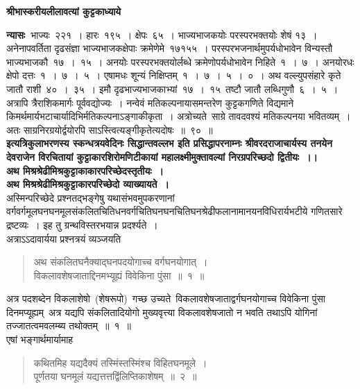 \documentclass[11pt, openany]{book}
\begin{document}
\textbf{श्रीभास्करीयलीलावत्यां कुट्टकाध्याये\textendash }


\newpage
\thispagestyle{fancy}
\fancyhf{}
\indent
\textbf{न्यासः\textendash\ }भाज्यः~२२१~। हारः~१९५~। क्षेपः~६५~। भाज्यभाजकयोः
परस्परभक्तयोः शेषं १३~। अनेनापवर्तिता दृढसंज्ञा भाज्यभाजकक्षेपाः क्रमेणेमे~१७\textendash१५\textendash५~। परस्परभजनार्थमुपर्यधोभावेन विन्यस्तौ भाज्यभाजकौ~१७~।~१५~। अनयोः परस्परभक्तयोर्लब्धे क्रमेणोपर्यधोभावेन निहिते~१~।~७~। अनयोरधः क्षेपो दत्तः~१~।~७~।~५~। एषामधः शून्यं निक्षिप्तम्~१~।~७~।~५~।~०~। अथ वल्ल्युपसंहारे कृते जातौ राशी~४०~।~३५~। इमौ दृढभाज्यभाजकाभ्यां~१७~।~१५~तष्टौ जातौ लब्धिगुणौ~६~।~५~। अत्रापि त्रैराशिकमार्गः पूर्ववद्योज्यः~। नन्वेवं मतिकल्पनायासमन्तरेण कुट्टकगणिते विद्यमाने किमर्थमार्यभटाचार्यादिभिर्मतिकल्पनाऽङ्गाकीकृता~। अत्रोच्यते\textendash\ साग्रे तावदवश्यं मतिकल्पनया भवितव्यम्~। अतः साग्रनिरग्रयोर्द्वयोरपि साऽस्त्वित्यङ्गीकृतेत्यदोषः~॥~९०~॥\\

\indent
\centering
\textbf{इत्यत्रिकुलाभरणस्य स्कन्धत्रयवेदिनः सिद्धान्तवल्लभ इति प्रसिद्धापरनाम्नः
श्रीवरदराजाचार्यस्य तनयेन देवराजेन विरचितायां कुट्टाकारशिरोमणिटीकायां महालक्ष्मीमुक्तावल्यां निरग्रपरिच्छदो द्वितीयः~।।}\\

\vspace{1cm}
\indent
\textbf{अथ मिश्रश्रेढीमिश्रकुट्टाकाकारपरिच्छेदस्तृतीयः~।}\\

\vspace{2mm}
\justifying
\indent
\textbf{अथ मिश्रश्रेढीमिश्रकुट्टाकारपरिच्छेदो व्याख्यायते~। }\\
अस्मिन्परिच्छेदे प्रश्नतद्भङ्गेषु यथासंभवमुपकरणानां वर्गवर्गमूलघनघनमूलसंकलितचितिधनवर्गचितिघनघनचितिघनश्रेढीफलानामानयनविधिरार्यभटीये गणितसारे द्रष्टव्यः~। इह तु ग्रन्थविस्तरभयान्न प्रदर्श्यते~।\\
\indent
अत्राऽऽदावार्यया प्रश्नत्रयं व्यञ्जयति\textendash
\begin{quote}
{\ks अथ संकलितघनैक्याद्घनपदयोगाच्च वर्गघनयोगात्~।\\
विकलावशेषजाताद्दिनमभ्यूह्यं विवेकिना पुंसा~॥~१~॥}
\end{quote}

\indent
अत्र पदशब्देन विकलाशेषो~(शेषरूपो)~गच्छ उच्यते\textendash\ विकलावशेषजाताद्वर्गघनयोगाच्च विवेकिना पुंसा दिनमप्यूह्यम्\textendash\ अत्र यद्यपि संकलितादियोगो मुख्यवृत्त्या विकलावशेषजातो न भवति तथाऽपि योगिनां तज्जातत्वमवलम्ब्य तथोक्तम्~॥~१~॥\\
\indent
एषां भङ्गार्थमार्यामाह\textendash
\begin{quote}
{\ks कथितमिह यद्यदैक्यं तस्मिंस्तस्मिंश्च विहितघनमूले~।\\
पूर्णतया घनमूलं यद्यत्तत्तद्विंलिप्तिकाशेषम्~॥~२~॥}
\end{quote}
\end{document}
